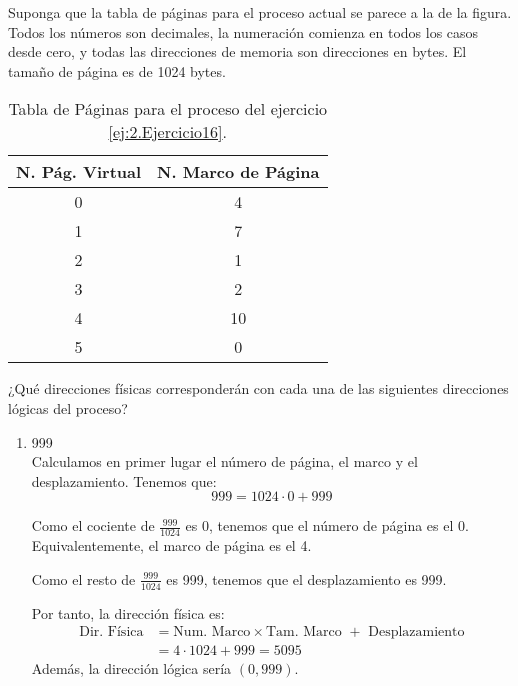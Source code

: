 \begin{ejercicio}\label{ej:2.Ejercicio16}
    Suponga que la tabla de páginas para el proceso actual se parece a la de la figura. Todos los números son decimales, la numeración comienza en todos los casos desde cero, y todas las direcciones de memoria son direcciones en bytes. El tamaño de página es de 1024 bytes.
    
    \begin{table}[H]
        \centering
        \begin{tabular}{|c|c|}
            \hline
            \textbf{N. Pág. Virtual} & \textbf{N. Marco de Página} \\ \hline
            0 & 4 \\
            1 & 7 \\
            2 & 1 \\
            3 & 2 \\
            4 & 10 \\
            5 & 0 \\ \hline
        \end{tabular}
        \caption{Tabla de Páginas para el proceso del ejercicio \ref{ej:2.Ejercicio16}.}
        \label{tab:ej16}
    \end{table}

    ¿Qué direcciones físicas corresponderán con cada una de las siguientes direcciones lógicas del proceso?
    \begin{enumerate}
        \item 999\\
        Calculamos en primer lugar el número de página, el marco y el desplazamiento. Tenemos que:
        \begin{equation*}
            999=1024\cdot 0 + 999
        \end{equation*}

        Como el cociente de $\frac{999}{1024}$ es 0, tenemos que el número de página es el 0. Equivalentemente, el marco de página es el 4.

        Como el resto de $\frac{999}{1024}$ es 999, tenemos que el desplazamiento es 999.

        Por tanto, la dirección física es:
        \begin{equation*}\begin{split}
            \text{Dir. Física} &= \text{Num. Marco}\times\text{Tam. Marco } + \text{ Desplazamiento}
            \\
            &= 4\cdot 1024 + 999 = 5095
        \end{split}\end{equation*}
        Además, la dirección lógica sería $(0,999)$.
        

\end{enumerate}
\end{ejercicio}
